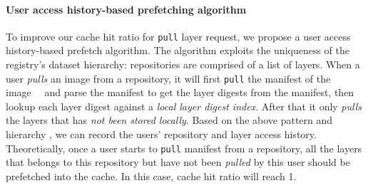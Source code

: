 \paragraph{User access history-based prefetching algorithm}
To improve our cache hit ratio for \texttt{pull} layer request, we propose a user access history-based prefetch algorithm. The algorithm
exploits the uniqueness of the registry's 
dataset hierarchy: repositories are comprised of a list of layers.
When a user \emph{pulls} an image from a repository, it will first \texttt{pull} the manifest of the image~\cite{docker}~\cite{dockerworkload} and 
parse the manifest to get the layer digests from the manifest,
then lookup each layer digest against a \emph{local layer digest index}.
After that it only \emph{pulls} the layers that has \emph{not been stored locally}.
%
Based on the above 
pattern and hierarchy 
, we can record the users' repository and layer access history. 
Theoretically, once a user starts to \texttt{pull} manifest from a repository, all the layers that belongs to this repository but have not been \emph{pulled} by this user should be prefetched into the cache.
In this case, cache hit ratio will reach 1.

